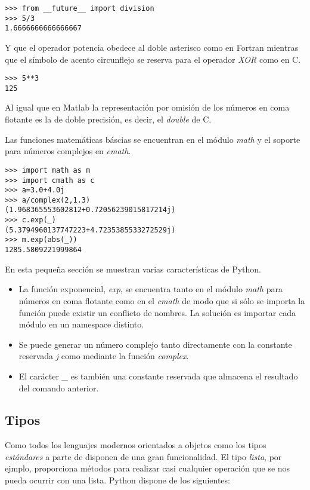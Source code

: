 \documentclass[a4paper,10pt]{article}
\begin{document}
\begin{lstlisting}
>>> from __future__ import division
>>> 5/3
1.6666666666666667
\end{lstlisting}

Y que el operador potencia obedece al doble asterisco como en Fortran
mientras que el símbolo de acento circunflejo se reserva para el
operador \emph{XOR} como en C.

\begin{lstlisting}
>>> 5**3
125
\end{lstlisting}

Al igual que en Matlab la representación por omisión de los números en
coma flotante es la de doble precisión, es decir, el \emph{double} de
C.

Las funciones matemáticas báscias se encuentran en el módulo
\emph{math} y el soporte para números complejos en \emph{cmath}.

\begin{lstlisting}
>>> import math as m
>>> import cmath as c
>>> a=3.0+4.0j
>>> a/complex(2,1.3)
(1.968365553602812+0.72056239015817214j)
>>> c.exp(_)
(5.3794960137747223+4.7235385533272529j)
>>> m.exp(abs(_))
1285.5809221999864
\end{lstlisting}

En esta pequeña sección se muestran varias características de Python.

\begin{itemize}
\item La función exponencial, \emph{exp}, se encuentra tanto en el
  módulo \emph{math} para números en coma flotante como en el
  \emph{cmath} de modo que si sólo se importa la función puede existir
  un conflicto de nombres.  La solución es importar cada módulo en un
  namespace distinto.
\item Se puede generar un número complejo tanto directamente con la
  constante reservada \emph{j} como mediante la función \emph{complex}.
\item El carácter \emph{\_} es también una constante reservada que
  almacena el resultado del comando anterior.
\end{itemize}

\subsection{Tipos}

Como todos los lenguajes modernos orientados a objetos como los tipos
\emph{estándares} a parte de disponen de una gran funcionalidad. El tipo
\emph{lista}, por ejmplo, proporciona métodos para realizar casi
cualquier operación que se nos pueda ocurrir con una lista.  Python
dispone de los siguientes:
\end{document}

